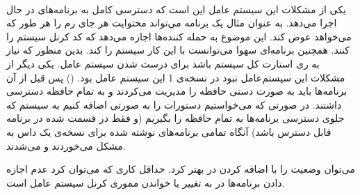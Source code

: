 \\
یکی از مشکلات این سیستم عامل این است که دسترسی کامل به برنامه‌های در حال اجرا می‌دهد. به عنوان مثال
یک برنامه‌ می‌تواند محتوایت هر جای رم را هر طور که می‌خواهد عوض کند. این موضوع به حمله کننده‌ها اجازه می‌دهد
که کد کرنل سیستم را
کنند. همچنین برنامه‌ای سهوا می‌توانست با این کار سیستم را
کند. بدین منظور که نیاز به ری استارت کل سیستم باشد برای درست شدن سیستم عامل.
یکی دیگر از مشکلات این سیستم‌عامل نبود
در نسخه‌ی 1 این سیستم عامل بود.
()
پس قبل از آن برنامه‌ها باید به صورت دستی حافظه را مدیریت می‌کردند و به تمام حافظه دسترسی داشتند.
در صورتی که می‌خواستیم دستورات
را به صورتی اضافه کنیم به سیستم که جلوی دسترسی برنامه‌ها به تمام حافظه را بگیریم
(و فقط در قسمت  شده در برنامه قابل دسترس باشد)
آنگاه تمامی برنامه‌های نوشته شده برای نسخه‌ی یک داس به مشکل می‌خوردند و
می‌شدند.

\noindent
می‌توان وضعیت را با اضافه کردن
در
بهتر کرد. حداقل کاری که می‌توان کرد عدم اجازه دادن برنامه‌ها در
به تغییر یا خواندن مموری کرنل سیستم عامل است.







